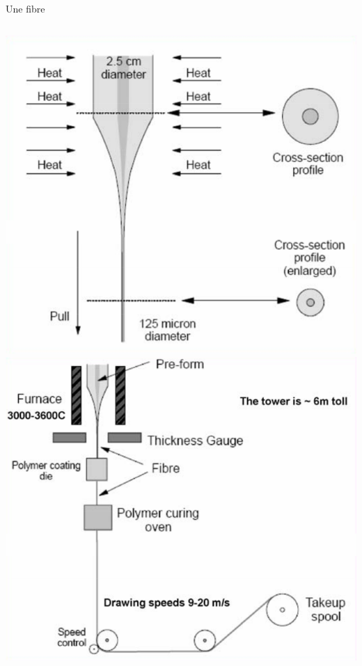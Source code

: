 \documentclass[aspectratio=149, 10pt, t]{beamer}
\begin{document}
\begin{frame}{Une fibre}
    \begin{columns}
        \begin{column}{0.5\linewidth}
            \begin{minipage}[b]{\linewidth}
                \centering
                \includegraphics[height=0.38\textheight]{images/fabrication_1}
                \includegraphics[height=0.38\textheight]{images/fabrication_2}


\end{minipage}
\end{column}
\end{columns}
\end{frame}
\end{document}

